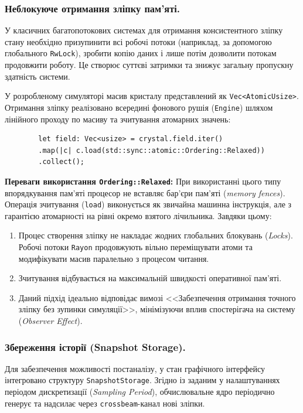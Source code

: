 \documentclass[14pt, a4paper]{extreport}
\begin{document}
	\subsubsection{Неблокуюче отримання зліпку пам'яті.}
	
	У класичних багатопотокових системах для отримання консистентного зліпку стану необхідно призупинити всі робочі потоки (наприклад, за допомогою глобального \texttt{RwLock}), зробити копію даних і лише потім дозволити потокам продовжити роботу. Це створює суттєві затримки та знижує загальну пропускну здатність системи.
	
	У розробленому симуляторі масив кристалу представлений як \texttt{Vec<AtomicUsize>}. Отримання зліпку реалізовано всередині фонового рушія (\texttt{Engine}) шляхом лінійного проходу по масиву та зчитування атомарних значень:
	
	\begin{verbatim}
		let field: Vec<usize> = crystal.field.iter()
		.map(|c| c.load(std::sync::atomic::Ordering::Relaxed))
		.collect();
	\end{verbatim}
	
	\textbf{Переваги використання \texttt{Ordering::Relaxed}:}
	При використанні цього типу впорядкування пам'яті процесор не вставляє бар'єри пам'яті (\textit{memory fences}). Операція зчитування (\texttt{load}) виконується як звичайна машинна інструкція, але з гарантією атомарності на рівні окремо взятого лічильника. 
	Завдяки цьому:
	\begin{enumerate}
		\item Процес створення зліпку не накладає жодних глобальних блокувань (\textit{Locks}). Робочі потоки \texttt{Rayon} продовжують вільно переміщувати атоми та модифікувати масив паралельно з процесом читання.
		\item Зчитування відбувається на максимальній швидкості оперативної пам'яті.
		\item Даний підхід ідеально відповідає вимозі <<Забезпечення отримання точного зліпку без зупинки симуляції>>, мінімізуючи вплив спостерігача на систему (\textit{Observer Effect}).
	\end{enumerate}
	
	\subsubsection{Збереження історії (Snapshot Storage).}
	
	Для забезпечення можливості постаналізу, у стан графічного інтерфейсу інтегровано структуру \texttt{SnapshotStorage}. 
	Згідно із заданим у налаштуваннях періодом дискретизації (\textit{Sampling Period}), обчислювальне ядро періодично генерує та надсилає через \texttt{crossbeam}-канал нові зліпки.
	
\end{document}
